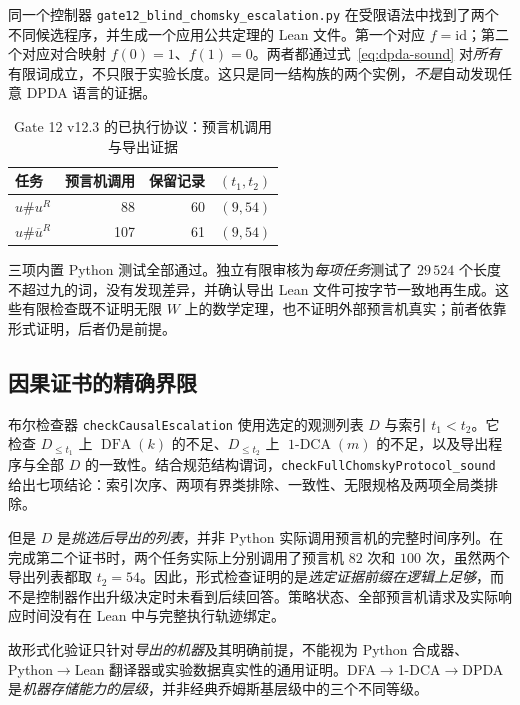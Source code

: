 \documentclass[11pt,a4paper,UTF8,fontset=none]{ctexart}
\newcommand{\DFA}{\operatorname{DFA}}
\newcommand{\oneDCA}{\operatorname{1\text{-}DCA}}
\begin{document}
同一个控制器 \texttt{gate12\_blind\_chomsky\_escalation.py} 在受限语法中找到了两个不同候选程序，并生成一个应用公共定理的 Lean 文件。第一个对应 $f=\mathrm{id}$；第二个对应对合映射 $f(0)=1$、$f(1)=0$。两者都通过式~\eqref{eq:dpda-sound} 对\emph{所有}有限词成立，不只限于实验长度。这只是同一结构族的两个实例，\emph{不是}自动发现任意 DPDA 语言的证据。

\begin{table}[htbp]
\centering\small
\caption{Gate 12 v12.3 的已执行协议：预言机调用与导出证据}\label{tab:gate12}
\renewcommand{\arraystretch}{1.15}
\begin{tabularx}{\linewidth}{@{}>{\raggedright\arraybackslash}Xrrr@{}}
\toprule
\textbf{任务} & \textbf{预言机调用} & \textbf{保留记录} & \textbf{$(t_1,t_2)$}\\
\midrule
$u\#u^R$ & 88 & 60 & $(9,54)$\\
$u\#\overline{u}^R$ & 107 & 61 & $(9,54)$\\
\bottomrule
\end{tabularx}
\end{table}

三项内置 Python 测试全部通过。独立有限审核为\emph{每项任务}测试了 $29\,524$ 个长度不超过九的词，没有发现差异，并确认导出 Lean 文件可按字节一致地再生成。这些有限检查既不证明无限 $W$ 上的数学定理，也不证明外部预言机真实；前者依靠形式证明，后者仍是前提。

\subsection{因果证书的精确界限}

布尔检查器 \texttt{checkCausalEscalation} 使用选定的观测列表 $D$ 与索引 $t_1<t_2$。它检查 $D_{\le t_1}$ 上 $\DFA(k)$ 的不足、$D_{\le t_2}$ 上 $\oneDCA(m)$ 的不足，以及导出程序与全部 $D$ 的一致性。结合规范结构谓词，\texttt{checkFullChomskyProtocol\_sound} 给出七项结论：索引次序、两项有界类排除、一致性、无限规格及两项全局类排除。

但是 $D$ 是\emph{挑选后导出的列表}，并非 Python 实际调用预言机的完整时间序列。在完成第二个证书时，两个任务实际上分别调用了预言机 $82$ 次和 $100$ 次，虽然两个导出列表都取 $t_2=54$。因此，形式检查证明的是\emph{选定证据前缀在逻辑上足够}，而不是控制器作出升级决定时未看到后续回答。策略状态、全部预言机请求及实际响应时间没有在 Lean 中与完整执行轨迹绑定。

故形式化验证只针对\emph{导出的机器}及其明确前提，不能视为 Python 合成器、Python$\to$Lean 翻译器或实验数据真实性的通用证明。DFA$\to$1-DCA$\to$DPDA 是\emph{机器存储能力的层级}，并非经典乔姆斯基层级中的三个不同等级。
\end{document}
